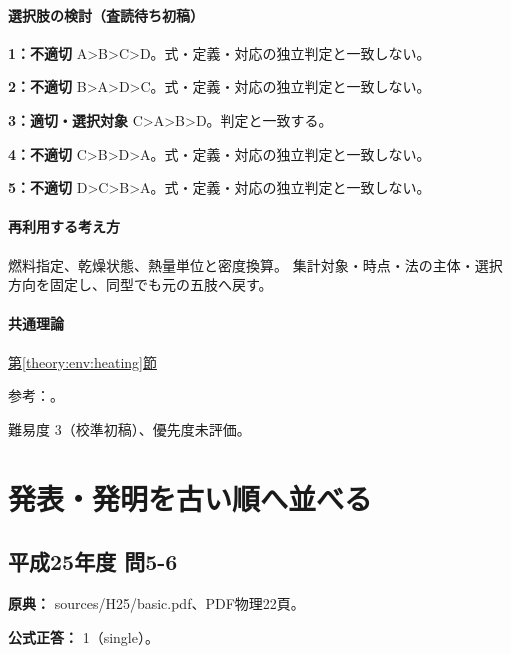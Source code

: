 \paragraph{選択肢の検討（査読待ち初稿）}\mbox{}\par

\noindent\textbf{1：不適切} A>B>C>D。式・定義・対応の独立判定と一致しない。\par

\noindent\textbf{2：不適切} B>A>D>C。式・定義・対応の独立判定と一致しない。\par

\noindent\textbf{3：適切・選択対象} C>A>B>D。判定と一致する。\par

\noindent\textbf{4：不適切} C>B>D>A。式・定義・対応の独立判定と一致しない。\par

\noindent\textbf{5：不適切} D>C>B>A。式・定義・対応の独立判定と一致しない。\par

\paragraph{再利用する考え方} 燃料指定、乾燥状態、熱量単位と密度換算。 集計対象・時点・法の主体・選択方向を固定し、同型でも元の五肢へ戻す。

\paragraph{共通理論} \hyperref[theory:env:heating]{第\ref*{theory:env:heating}節}

\par 参考：\cite{env58_heating}。

\par 難易度 3（校準初稿）、優先度未評価。

\section{発表・発明を古い順へ並べる}

\subsection{平成25年度 問5-6}
\label{q:h25-reg-basic-5-6}

\noindent\textbf{原典：} sources/H25/basic.pdf、PDF物理22頁。

\textbf{公式正答：} 1（single）。

